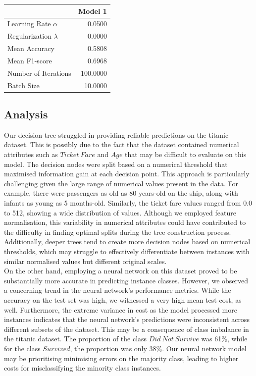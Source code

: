 \documentclass{article}
\begin{document}
\hfill
\begin{minipage}{0.49\textwidth}
    \centering
    \begin{tabular}{lr}
        \toprule
         & Model 1 \\
        \midrule
        Learning Rate $\alpha$ & 0.0500 \\
        Regularization $\lambda$ & 0.0000 \\
        Mean Accuracy & 0.5808 \\
        Mean F1-score & 0.6968 \\
        Number of Iterations & 100.0000 \\
        Batch Size & 10.0000 \\
        \bottomrule
        \end{tabular}
\end{minipage}

\subsection*{Analysis}
Our decision tree struggled in providing reliable predictions on the titanic dataset. 
This is possibly due to the fact that the dataset contained numerical attributes such as $Ticket\ Fare$ and $Age$
that may be difficult to evaluate on this model.
The decision nodes were split based on a numerical threshold that maximised information gain at each decision point.
This approach is particularly challenging given the large range of numerical values present in the data.
For example, there were passengers as old as 80 years-old on the ship, along with infants as young as 5 months-old.
Similarly, the ticket fare values ranged from 0.0 to 512, showing a wide distribution of values. 
Although we employed feature normalisation, this variability in numerical attributes could have contributed to 
the difficulty in finding optimal splits during the tree construction process. 
Additionally, deeper trees tend to create more decision nodes based on numerical thresholds, 
which may struggle to effectively differentiate between instances with similar normalised values but different original scales.
\\

On the other hand, employing a neural network on this dataset proved to be substantially more accurate in predicting instance classes.
However, we observed a concerning trend in the neural network's performance metrics. 
While the accuracy on the test set was high, we witnessed a very high mean test cost, as well.
Furthermore, the extreme variance in cost as the model processed more instances
indicates that the neural network's predictions were inconsistent across different subsets of the dataset.
This may be a consequence of class imbalance in the titanic dataset.
The proportion of the class $Did\ Not\ Survive$ was 61\%, 
while for the class $Survived$, the proportion was only 38\%.
Our neural network model may be prioritising minimising errors on the majority class, 
leading to higher costs for misclassifying the minority class instances.
\\
\end{document}
